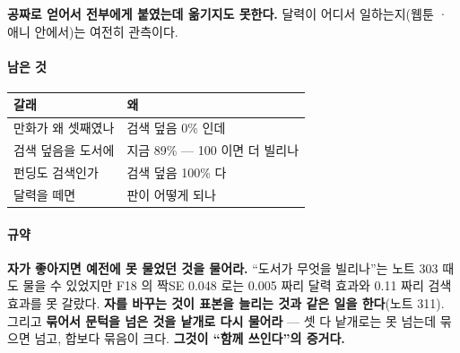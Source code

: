 \documentclass[10pt]{article}
\begin{document}
\textbf{공짜로 얻어서 전부에게 붙였는데 옮기지도 못한다.} 달력이 어디서
일하는지(웹툰 · 애니 안에서)는 여전히 관측이다.

\paragraph{남은 것}
\begin{center}\small
\begin{tabular}{ll}
\hline
갈래 & 왜 \\
\hline
만화가 왜 셋째였나 & 검색 덮음 0\% 인데 \\
검색 덮음을 도서에 & 지금 89\% --- 100 이면 더 빌리나 \\
펀딩도 검색인가 & 검색 덮음 100\% 다 \\
달력을 떼면 & 판이 어떻게 되나 \\
\hline
\end{tabular}
\end{center}

\paragraph{규약} \textbf{자가 좋아지면 예전에 못 물었던 것을 물어라.}
``도서가 무엇을 빌리나''는 노트 303 때도 물을 수 있었지만 F18 의 짝SE
0.048 로는 0.005 짜리 달력 효과와 0.11 짜리 검색 효과를 못 갈랐다.
\textbf{자를 바꾸는 것이 표본을 늘리는 것과 같은 일을 한다}(노트 311).
그리고 \textbf{묶어서 문턱을 넘은 것을 낱개로 다시 물어라} --- 셋 다 낱개로는
못 넘는데 묶으면 넘고, 합보다 묶음이 크다. \textbf{그것이 ``함께 쓰인다''의
증거다.}
\end{document}

